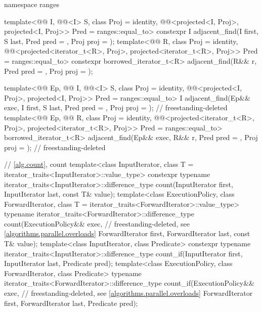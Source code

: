 \begin{codeblock}
{  namespace ranges {
    template<@@ I, @@<I> S, class Proj = identity,
             @@<projected<I, Proj>,
                                       projected<I, Proj>> Pred = ranges::equal_to>
      constexpr I adjacent_find(I first, S last, Pred pred = {},
                                Proj proj = {});
    template<@@ R, class Proj = identity,
             @@<projected<iterator_t<R>, Proj>,
                                       projected<iterator_t<R>, Proj>> Pred = ranges::equal_to>
      constexpr borrowed_iterator_t<R>
        adjacent_find(R&& r, Pred pred = {}, Proj proj = {});

    template<@@ Ep, @@ I, @@<I> S,
             class Proj = identity,
             @@<projected<I, Proj>,
                                       projected<I, Proj>> Pred = ranges::equal_to>
      I adjacent_find(Ep&& exec, I first, S last, Pred pred = {},
                      Proj proj = {});                                      // freestanding-deleted
    template<@@ Ep, @@ R, class Proj = identity,
             @@<projected<iterator_t<R>, Proj>,
                                       projected<iterator_t<R>, Proj>> Pred = ranges::equal_to>
      borrowed_iterator_t<R>
        adjacent_find(Ep&& exec, R&& r, Pred pred = {}, Proj proj = {});    // freestanding-deleted
  }

  // \ref{alg.count}, count
  template<class InputIterator, class T = iterator_traits<InputIterator>::value_type>
    constexpr typename iterator_traits<InputIterator>::difference_type
      count(InputIterator first, InputIterator last, const T& value);
  template<class ExecutionPolicy, class ForwardIterator,
           class T = iterator_traits<ForwardIterator>::value_type>
    typename iterator_traits<ForwardIterator>::difference_type
      count(ExecutionPolicy&& exec,                             // freestanding-deleted, see \ref{algorithms.parallel.overloads}
            ForwardIterator first, ForwardIterator last, const T& value);
  template<class InputIterator, class Predicate>
    constexpr typename iterator_traits<InputIterator>::difference_type
      count_if(InputIterator first, InputIterator last, Predicate pred);
  template<class ExecutionPolicy, class ForwardIterator, class Predicate>
    typename iterator_traits<ForwardIterator>::difference_type
      count_if(ExecutionPolicy&& exec,                          // freestanding-deleted, see \ref{algorithms.parallel.overloads}
               ForwardIterator first, ForwardIterator last, Predicate pred);

}
\end{codeblock}
